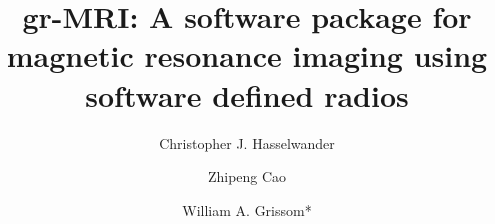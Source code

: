 \documentclass[review]{elsarticle}
\newif\ifmarkedup
\renewcommand{\textcolor}[1]{}
\begin{document}
\begin{frontmatter}
\ifmarkedup
	\title{\textcolor{red}{Highlighted Copy:}\\gr-MRI: A software package for magnetic resonance imaging using software defined radios}
\else
	\title{gr-MRI: A software package for magnetic resonance imaging using software defined radios}
\fi

\author[bme,vuiis]{Christopher J. Hasselwander}
\author[bme,vuiis]{Zhipeng Cao}
\author[bme,rad,vuiis]{William A. Grissom*}


\address[bme]{Department of Biomedical Engineering, Vanderbilt University, Nashville, Tennessee, USA}
\address[rad]{Department of Radiology and Radiological Sciences, Vanderbilt University, Nashville, Tennessee, USA}
\address[vuiis]{Vanderbilt University Institute of Imaging Science, Nashville, Tennessee, USA}


\end{frontmatter}
\end{document}
